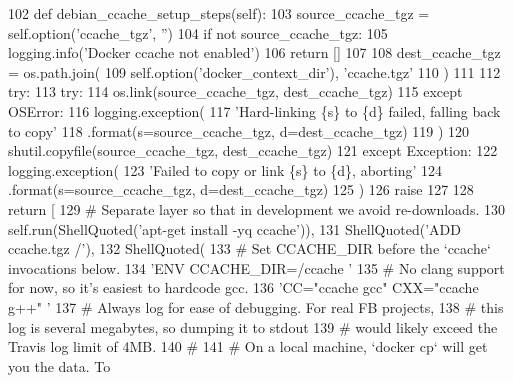 \begin{DoxyCode}
102     \textcolor{keyword}{def }debian_ccache_setup_steps(self):
103         source\_ccache\_tgz = self.option(\textcolor{stringliteral}{'ccache\_tgz'}, \textcolor{stringliteral}{''})
104         \textcolor{keywordflow}{if} \textcolor{keywordflow}{not} source\_ccache\_tgz:
105             logging.info(\textcolor{stringliteral}{'Docker ccache not enabled'})
106             \textcolor{keywordflow}{return} []
107 
108         dest\_ccache\_tgz = os.path.join(
109             self.option(\textcolor{stringliteral}{'docker\_context\_dir'}), \textcolor{stringliteral}{'ccache.tgz'}
110         )
111 
112         \textcolor{keywordflow}{try}:
113             \textcolor{keywordflow}{try}:
114                 os.link(source\_ccache\_tgz, dest\_ccache\_tgz)
115             \textcolor{keywordflow}{except} OSError:
116                 logging.exception(
117                     \textcolor{stringliteral}{'Hard-linking \{s\} to \{d\} failed, falling back to copy'}
118                     .format(s=source\_ccache\_tgz, d=dest\_ccache\_tgz)
119                 )
120                 shutil.copyfile(source\_ccache\_tgz, dest\_ccache\_tgz)
121         \textcolor{keywordflow}{except} Exception:
122             logging.exception(
123                 \textcolor{stringliteral}{'Failed to copy or link \{s\} to \{d\}, aborting'}
124                 .format(s=source\_ccache\_tgz, d=dest\_ccache\_tgz)
125             )
126             \textcolor{keywordflow}{raise}
127 
128         \textcolor{keywordflow}{return} [
129             \textcolor{comment}{# Separate layer so that in development we avoid re-downloads.}
130             self.run(ShellQuoted(\textcolor{stringliteral}{'apt-get install -yq ccache'})),
131             ShellQuoted(\textcolor{stringliteral}{'ADD ccache.tgz /'}),
132             ShellQuoted(
133                 \textcolor{comment}{# Set CCACHE\_DIR before the `ccache` invocations below.}
134                 \textcolor{stringliteral}{'ENV CCACHE\_DIR=/ccache '}
135                 \textcolor{comment}{# No clang support for now, so it's easiest to hardcode gcc.}
136                 \textcolor{stringliteral}{'CC="ccache gcc" CXX="ccache g++" '}
137                 \textcolor{comment}{# Always log for ease of debugging. For real FB projects,}
138                 \textcolor{comment}{# this log is several megabytes, so dumping it to stdout}
139                 \textcolor{comment}{# would likely exceed the Travis log limit of 4MB.}
140                 \textcolor{comment}{#}
141                 \textcolor{comment}{# On a local machine, `docker cp` will get you the data.  To}

\end{DoxyCode}
